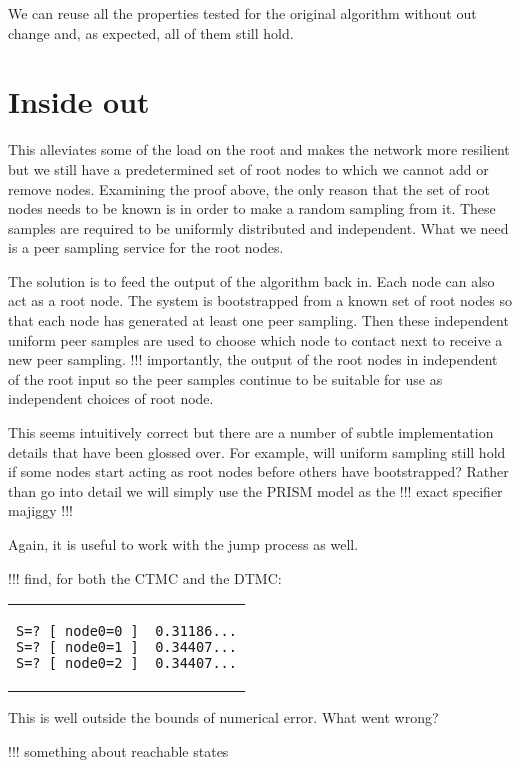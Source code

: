 \documentclass[a4paper,10pt]{article}
\newcommand{\prismmodel}[1]{
  \begin{quotation}
  \footnotesize
  
  \end{quotation}
}
\newenvironment{prismprop}[0]{
  \begin{center}
  \begin{tabular}{c}
  \footnotesize
}{
  \end{tabular}
  \end{center}
}
\begin{document}
We can reuse all the properties tested for the original algorithm without out change and, as expected, all of them still hold.

\section{Inside out}

This alleviates some of the load on the root and makes the network more resilient but we still have a predetermined set of root nodes to which we cannot add or remove nodes. Examining the proof above, the only reason that the set of root nodes needs to be known is in order to make a random sampling from it. These samples are required to be uniformly distributed and independent. What we need is a peer sampling service for the root nodes.

The solution is to feed the output of the algorithm back in. Each node can also act as a root node. The system is bootstrapped from a known set of root nodes so that each node has generated at least one peer sampling. Then these independent uniform peer samples are used to choose which node to contact next to receive a new peer sampling. !!! importantly, the output of the root nodes in independent of the root input so the peer samples continue to be suitable for use as independent choices of root node.

This seems intuitively correct but there are a number of subtle implementation details that have been glossed over. For example, will uniform sampling still hold if some nodes start acting as root nodes before others have bootstrapped? Rather than go into detail we will simply use the PRISM model as the !!! exact specifier majiggy !!!

\prismmodel{ctmc_broken}

Again, it is useful to work with the jump process as well.

\prismmodel{dtmc_broken}

!!! find, for both the CTMC and the DTMC:

\begin{prismprop}
\begin{lstlisting}
S=? [ node0=0 ]  0.31186...
S=? [ node0=1 ]  0.34407...
S=? [ node0=2 ]  0.34407...
\end{lstlisting}
\end{prismprop}

This is well outside the bounds of numerical error. What went wrong? 

!!! something about reachable states
\end{document}
